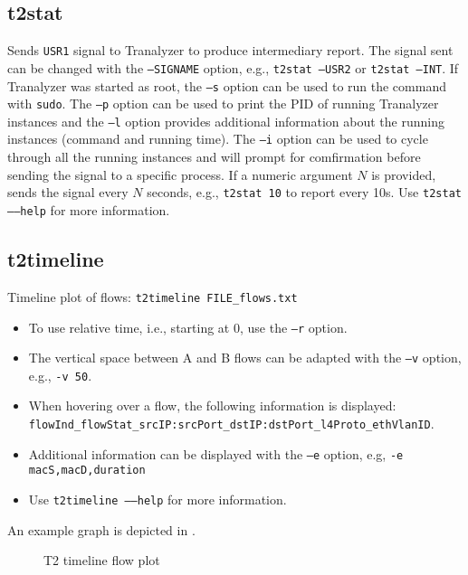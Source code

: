 \documentclass[documentation]{subfiles}
\begin{document}
\subsection{t2stat}\label{t2stat}
Sends {\tt USR1} signal to Tranalyzer to produce intermediary report.
The signal sent can be changed with the {\tt --SIGNAME} option, e.g., {\tt t2stat --USR2} or {\tt t2stat --INT}.
If Tranalyzer was started as root, the {\tt --s} option can be used to run the command with {\tt sudo}.
The {\tt --p} option can be used to print the PID of running Tranalyzer instances and the {\tt --l} option provides additional information about the running instances (command and running time).
The {\tt --i} option can be used to cycle through all the running instances and will prompt for comfirmation before sending the signal to a specific process.
If a numeric argument $N$ is provided, sends the signal every $N$ seconds, e.g., {\tt t2stat 10} to report every 10s.
Use {\tt t2stat --{}--help} for more information.

\subsection{t2timeline}\label{t2timeline}
Timeline plot of flows: {\tt t2timeline FILE\_flows.txt}

\begin{itemize}
    \item To use relative time, i.e., starting at 0, use the {\tt --r} option.
    \item The vertical space between A and B flows can be adapted with the {\tt --v} option, e.g., {\tt -v 50}.
    \item When hovering over a flow, the following information is displayed:\\
          {\tt flowInd\_flowStat\_srcIP:srcPort\_dstIP:dstPort\_l4Proto\_ethVlanID}.
    \item Additional information can be displayed with the {\tt --e} option, e.g, {\tt -e macS,macD,duration}
    \item Use {\tt t2timeline --{}--help} for more information.
\end{itemize}

\noindent An example graph is depicted in .

\begin{figure}[!ht]
    \centering
    \caption{T2 timeline flow plot}
    \label{fig:t2timeline}
\end{figure}
\end{document}
